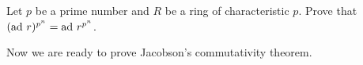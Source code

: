 \begin{exercise}
    Let $p$ be a prime number and $R$ be a ring of characteristic $p$. 
    Prove that $(\operatorname{ad}\,r)^{p^n}=\operatorname{ad}\,r^{p^n}$. 
\end{exercise}



Now we are ready to prove Jacobson's commutativity theorem. 

